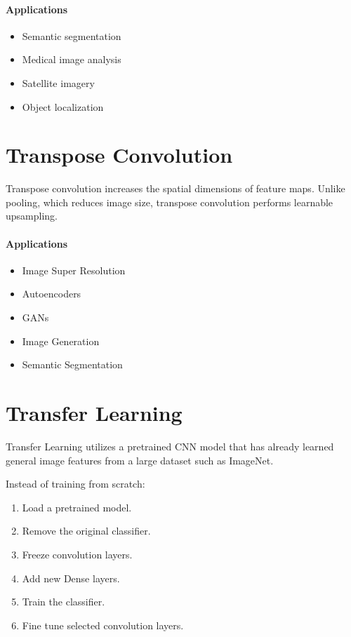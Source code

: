 \documentclass[11pt]{article}
\begin{document}
\paragraph{Applications}
\begin{itemize}[leftmargin=*]
    \item Semantic segmentation
    \item Medical image analysis
    \item Satellite imagery
    \item Object localization
\end{itemize}

\section{Transpose Convolution}
Transpose convolution increases the spatial dimensions of feature maps. Unlike pooling, which reduces image size, transpose convolution performs learnable upsampling.

\paragraph{Applications}
\begin{itemize}[leftmargin=*]
    \item Image Super Resolution
    \item Autoencoders
    \item GANs
    \item Image Generation
    \item Semantic Segmentation
\end{itemize}

\section{Transfer Learning}
Transfer Learning utilizes a pretrained CNN model that has already learned general image features from a large dataset such as ImageNet.

Instead of training from scratch:
\begin{enumerate}[leftmargin=*]
    \item Load a pretrained model.
    \item Remove the original classifier.
    \item Freeze convolution layers.
    \item Add new Dense layers.
    \item Train the classifier.
    \item Fine tune selected convolution layers.
\end{enumerate}
\end{document}
